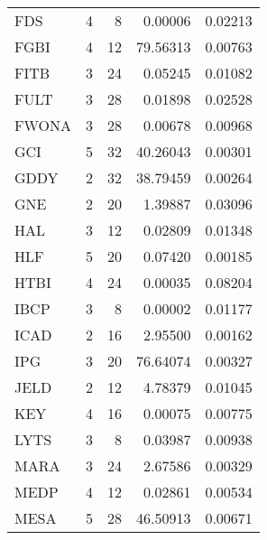 \begin{table}[H]
\begin{tabular}{lrrrr}
FDS & 4 & 8 & 0.00006 & 0.02213 \\
FGBI & 4 & 12 & 79.56313 & 0.00763 \\
FITB & 3 & 24 & 0.05245 & 0.01082 \\
FULT & 3 & 28 & 0.01898 & 0.02528 \\
FWONA & 3 & 28 & 0.00678 & 0.00968 \\
GCI & 5 & 32 & 40.26043 & 0.00301 \\
GDDY & 2 & 32 & 38.79459 & 0.00264 \\
GNE & 2 & 20 & 1.39887 & 0.03096 \\
HAL & 3 & 12 & 0.02809 & 0.01348 \\
HLF & 5 & 20 & 0.07420 & 0.00185 \\
HTBI & 4 & 24 & 0.00035 & 0.08204 \\
IBCP & 3 & 8 & 0.00002 & 0.01177 \\
ICAD & 2 & 16 & 2.95500 & 0.00162 \\
IPG & 3 & 20 & 76.64074 & 0.00327 \\
JELD & 2 & 12 & 4.78379 & 0.01045 \\
KEY & 4 & 16 & 0.00075 & 0.00775 \\
LYTS & 3 & 8 & 0.03987 & 0.00938 \\
MARA & 3 & 24 & 2.67586 & 0.00329 \\
MEDP & 4 & 12 & 0.02861 & 0.00534 \\
MESA & 5 & 28 & 46.50913 & 0.00671 \\
\bottomrule
\end{tabular}
\end{table}
